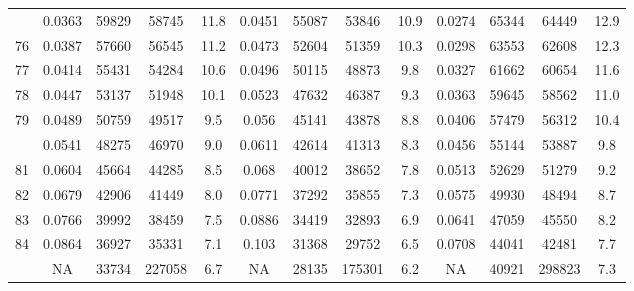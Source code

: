 \documentclass[
  14pt,
]{article}
\begin{document}
\begin{longtable}[t]{lcccccccccccc}
\addlinespace
75 & 0.0363 & 59829 & 58745 & 11.8 & 0.0451 & 55087 & 53846 & 10.9 & 0.0274 & 65344 & 64449 & 12.9\\
76 & 0.0387 & 57660 & 56545 & 11.2 & 0.0473 & 52604 & 51359 & 10.3 & 0.0298 & 63553 & 62608 & 12.3\\
77 & 0.0414 & 55431 & 54284 & 10.6 & 0.0496 & 50115 & 48873 & 9.8 & 0.0327 & 61662 & 60654 & 11.6\\
78 & 0.0447 & 53137 & 51948 & 10.1 & 0.0523 & 47632 & 46387 & 9.3 & 0.0363 & 59645 & 58562 & 11.0\\
79 & 0.0489 & 50759 & 49517 & 9.5 & 0.056 & 45141 & 43878 & 8.8 & 0.0406 & 57479 & 56312 & 10.4\\
\addlinespace
80 & 0.0541 & 48275 & 46970 & 9.0 & 0.0611 & 42614 & 41313 & 8.3 & 0.0456 & 55144 & 53887 & 9.8\\
81 & 0.0604 & 45664 & 44285 & 8.5 & 0.068 & 40012 & 38652 & 7.8 & 0.0513 & 52629 & 51279 & 9.2\\
82 & 0.0679 & 42906 & 41449 & 8.0 & 0.0771 & 37292 & 35855 & 7.3 & 0.0575 & 49930 & 48494 & 8.7\\
83 & 0.0766 & 39992 & 38459 & 7.5 & 0.0886 & 34419 & 32893 & 6.9 & 0.0641 & 47059 & 45550 & 8.2\\
84 & 0.0864 & 36927 & 35331 & 7.1 & 0.103 & 31368 & 29752 & 6.5 & 0.0708 & 44041 & 42481 & 7.7\\
\addlinespace
85 & NA & 33734 & 227058 & 6.7 & NA & 28135 & 175301 & 6.2 & NA & 40921 & 298823 & 7.3\\*
\end{longtable}
\end{document}

